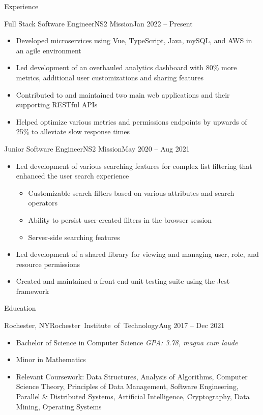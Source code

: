 \documentclass[]{mcdowellcv}
\begin{document}
	\makeheader
	
	\begin{cvsection}{Experience}
		\begin{cvsubsection}{Full Stack Software Engineer}{NS2 Mission}{Jan 2022 -- Present}	
			\begin{itemize}
				\item Developed microservices using Vue, TypeScript, Java, mySQL, and AWS in an agile environment
				\item Led development of an overhauled analytics dashboard with 80\% more metrics, additional user customizations and sharing features
				\item Contributed to and maintained two main web applications and their supporting RESTful APIs
				\item Helped optimize various metrics and permissions endpoints by upwards of 25\% to alleviate slow response times
			\end{itemize}
		\end{cvsubsection}

		\begin{cvsubsection}{Junior Software Engineer}{NS2 Mission}{May 2020 -- Aug 2021}	
			\begin{itemize}
				\item Led development of various searching features for complex list filtering that enhanced the user search experience
				\begin{itemize}
					\item Customizable search filters based on various attributes and search operators
					\item Ability to persist user-created filters in the browser session
					\item Server-side searching features
				\end{itemize}
				\item Led development of a shared library for viewing and managing user, role, and resource permissions
				\item Created and maintained a front end unit testing suite using the Jest framework
			\end{itemize}
		\end{cvsubsection}
	\end{cvsection}
	
	\begin{cvsection}{Education}
		\begin{cvsubsection}{Rochester, NY}{\mbox{Rochester Institute of Technology}}{Aug 2017 -- Dec 2021}
			\begin{itemize}
				\item Bachelor of Science in Computer Science \hfill \textit{GPA: 3.78, magna cum laude}
				\item Minor in Mathematics
				\item Relevant Coursework: Data Structures, Analysis of Algorithms, Computer Science Theory, Principles of Data Management, Software Engineering, Parallel \& Distributed Systems, Artificial Intelligence, 
				Cryptography, Data Mining, Operating Systems
			\end{itemize}
		\end{cvsubsection}
	\end{cvsection}
\end{document}
